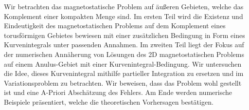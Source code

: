 \documentclass[../../master_thesis.tex]{subfiles}
\begin{document}
Wir betrachten das magnetostatische Problem auf äußeren Gebieten, 
welche das Komplement einer kompakten Menge sind. Im ersten Teil 
wird die Existenz und Eindeutigkeit des magnetostatischen Problems 
auf dem Komplement eines torusförmigen Gebietes bewiesen mit einer zusätzlichen
Bedingung in Form eines Kurvenintegrals unter passenden Annahmen. 
Im zweiten Teil liegt der Fokus auf der numerischen Annäherung von Lösungen 
des 2D magnetostatischen Problems auf einem Anulus-Gebiet mit einer Kurvenintegral-Bedingung.
Wir untersuchen die Idee, dieses Kurvenintegral mithilfe partieller Integration 
zu ersetzen und im Variationsproblem zu betrachten. Wir beweisen, dass das Problem wohl 
gestellt ist und eine A-Priori Abschätzung des Fehlers. Am Ende werden numerische Beispiele
präsentiert, welche die theoretischen Vorhersagen bestätigen.
\end{document}
